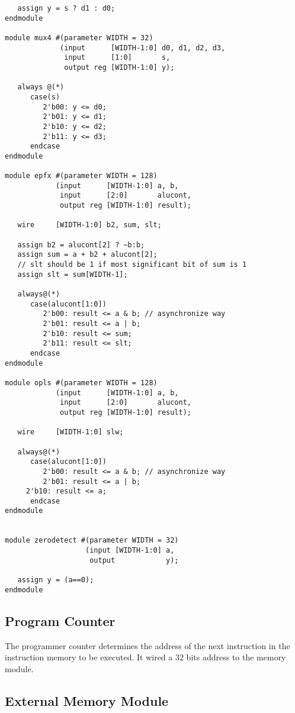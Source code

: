 \documentclass[preprint,authoryear,12pt]{elsarticle}
\begin{document}
\begin{verbatim}
   assign y = s ? d1 : d0; 
endmodule

module mux4 #(parameter WIDTH = 32)
             (input      [WIDTH-1:0] d0, d1, d2, d3,
              input      [1:0]       s, 
              output reg [WIDTH-1:0] y);

   always @(*)
      case(s)
         2'b00: y <= d0;
         2'b01: y <= d1;
         2'b10: y <= d2;
         2'b11: y <= d3;
      endcase
endmodule

module epfx #(parameter WIDTH = 128)
            (input      [WIDTH-1:0] a, b, 
             input      [2:0]       alucont, 
             output reg [WIDTH-1:0] result);

   wire     [WIDTH-1:0] b2, sum, slt;

   assign b2 = alucont[2] ? ~b:b; 
   assign sum = a + b2 + alucont[2];
   // slt should be 1 if most significant bit of sum is 1
   assign slt = sum[WIDTH-1];

   always@(*)
      case(alucont[1:0])
         2'b00: result <= a & b; // asynchronize way
         2'b01: result <= a | b;
         2'b10: result <= sum;
         2'b11: result <= slt;
      endcase
endmodule

module opls #(parameter WIDTH = 128)
            (input      [WIDTH-1:0] a, b, 
             input      [2:0]       alucont, 
             output reg [WIDTH-1:0] result);

   wire     [WIDTH-1:0] slw;
   
   always@(*)
      case(alucont[1:0])
         2'b00: result <= a & b; // asynchronize way
         2'b01: result <= a | b;
	 2'b10: result <= a;
      endcase
endmodule


module zerodetect #(parameter WIDTH = 32)
                   (input [WIDTH-1:0] a, 
                    output            y);

   assign y = (a==0);
endmodule
\end{verbatim}


\subsection{Program Counter}

The programmer counter determines the address of the next instruction
in the instruction memory to be executed. It wired a 32 bits address
to the memory module.


\subsection{External Memory Module}
\end{document}
